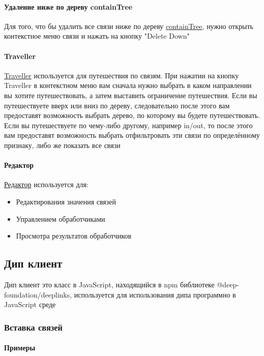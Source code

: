 \documentclass{article}
\begin{document}
\paragraph{Удаление ниже по дереву containTree}
Для того, что бы удалить все связи ниже по дереву
\hyperlink{containTree.Def}{containTree}, нужно открыть контекстное меню связи
и нажать на кнопку "Delete Down"
\paragraph*{Traveller}
\hyperlink{Traveller.Def}{Traveller} используется для путешествия по связям. 
При нажатии на кнопку Traveller в контекстном меню вам сначала нужно выбрать в каком направлении вы хотите путешествовать, а затем выставить ограничение путешествия. 
Если вы путешествуете вверх или вниз по дереву, следовательно после этого вам предоставят возможность выбрать дерево, по которому вы будете путешествовать.
Если вы путешествуете по чему-либо другому, например in/out, то после этого вам предоставят возможность выбрать отфильтровать эти связи по определённому признаку, либо же показать все связи
\paragraph*{Редактор}
\hyperlink{Editor.Def}{Редактор} используется для:
\begin{itemize}
  \item Редактирования значения связей
  \item Управлением обработчиками
  \item Просмотра результатов обработчиков
\end{itemize}

\subsection{Дип клиент}
Дип клиент это класс в JavaScript, находящийся в npm библиотеке
@deep-foundation/deeplinks, используется для использования дипа
программно в JavaScript среде

\subsubsection{Вставка связей}

\paragraph{Примеры}
\end{document}
